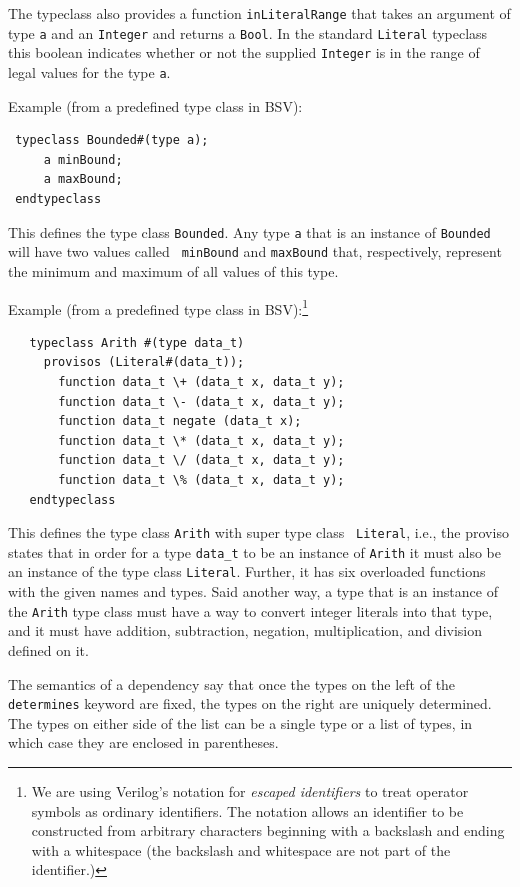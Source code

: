 \documentclass[twoside,letterpaper]{article}
\newcommand{\BSV}{BSV}
\newcommand{\V}{Verilog}
\newcommand{\te}[1]{\texttt{#1}}
\begin{document}
The typeclass also provides a function \texttt{inLiteralRange} that takes
an argument of type \texttt{a} and an \texttt{Integer} and returns a 
\texttt{Bool}. In the standard \texttt{Literal} typeclass this boolean
indicates whether or not the supplied \texttt{Integer} is in the range
of legal values for the type \texttt{a}.
 
Example (from a predefined type class in {\BSV}):
\begin{verbatim}
 typeclass Bounded#(type a);
     a minBound;
     a maxBound;
 endtypeclass
\end{verbatim}
This defines the type class \texttt{Bounded}.  Any type \texttt{a} that is
an instance of \texttt{Bounded} will have two values called {\tt
minBound} and \texttt{maxBound} that, respectively, represent the minimum
and maximum of all values of this type.

Example (from a predefined type class in {\BSV}):\footnote{ We are
using {\V}'s notation for \emph{escaped identifiers} to treat operator
symbols as ordinary identifiers.  The notation allows an identifier to
be constructed from arbitrary characters beginning with a backslash
and ending with a whitespace (the backslash and whitespace are not
part of the identifier.)}
\begin{verbatim}
   typeclass Arith #(type data_t)
     provisos (Literal#(data_t));
       function data_t \+ (data_t x, data_t y);
       function data_t \- (data_t x, data_t y);
       function data_t negate (data_t x);
       function data_t \* (data_t x, data_t y);
       function data_t \/ (data_t x, data_t y);
       function data_t \% (data_t x, data_t y);
   endtypeclass
\end{verbatim}
This defines the type class \texttt{Arith} with super type class {\tt
Literal}, i.e., the proviso states that in order for a type \texttt{data\_t} to
be an instance of \texttt{Arith} it must also be an instance of the type
class \texttt{Literal}.  Further, it has six overloaded functions with
the given names and types.  Said another way, a type that is an
instance of the \texttt{Arith} type class must have a way to convert
integer literals into that type, and it must have addition,
subtraction, negation, multiplication, and division defined on it.

The
semantics of a dependency say that once the types on the left of the
\te{determines} keyword are fixed, the types on the right are 
uniquely  determined.  The types on either side of the list can be a
single type or a list of types, in which case they are enclosed in
parentheses.
\end{document}
